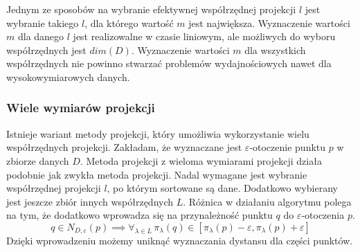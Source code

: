 Jednym ze sposobów na wybranie efektywnej współrzędnej projekcji $ l $ jest wybranie takiego $ l $, dla którego wartość $ m $ jest największa. Wyznaczenie wartości $ m $ dla danego $ l $ jest realizowalne w czasie liniowym, ale możliwych do wyboru współrzędnych jest $ dim(D) $. Wyznaczenie wartości $ m $ dla wszystkich współrzędnych nie powinno stwarzać problemów wydajnościowych nawet dla wysokowymiarowych danych.

\subsubsection{Wiele wymiarów projekcji}
Istnieje wariant metody projekcji, który umożliwia wykorzystanie wielu współrzędnych projekcji. Zakładam, że wyznaczane jest $ \varepsilon $-otoczenie punktu $ p $ w zbiorze danych $ D $. Metoda projekcji z wieloma wymiarami projekcji działa podobnie jak zwykła metoda projekcji. Nadal wymagane jest wybranie współrzędnej projekcji $ l $, po którym sortowane są dane. Dodatkowo wybierany jest jeszcze zbiór innych współrzędnych $ L $. Różnica w działaniu algorytmu polega na tym, że dodatkowo wprowadza się  na przynależność punktu $ q $ do $ \varepsilon $-otoczenia $ p $.
\begin{equation}\label{eq:projection-mult}
	q \in N_{D,\varepsilon}(p) \implies  \forall_{\lambda\in L}\,\pi_\lambda(q) \in \left[\pi_\lambda(p)-\varepsilon,\pi_\lambda(p)+\varepsilon\right] 
\end{equation}
Dzięki wprowadzeniu  możemy uniknąć wyznaczania dystansu dla części punktów.

